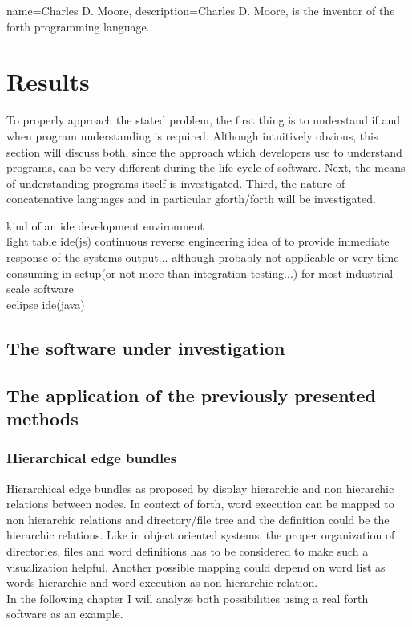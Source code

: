 {
  name={Charles D. Moore},
  description={Charles D. Moore, is the inventor of the forth programming language.}
}

\chapter{Results}
\label{chap:Results}

To properly approach the stated problem, the first thing is to understand if and when program understanding is required. Although intuitively obvious, this section will discuss both, since the approach which developers use to understand programs, can be very different during the life cycle of software. Next, the means of understanding programs itself is investigated. Third, the nature of concatenative languages and in particular gforth/forth will be investigated.



kind of an \sout{ide} development environment\\
light table ide(js) continuous reverse engineering idea of \cite{Muller:2000:RER:336512.336526} to provide immediate response of the systems output... although probably not applicable or very time consuming in setup(or not more than integration testing...) for most industrial scale software\\
eclipse ide(java)

\section{The software under investigation}



\section{The application of the previously presented methods}

\subsection*{Hierarchical edge bundles}
Hierarchical edge bundles as proposed by \cite{Holten:2006:HEB:1187627.1187772} display hierarchic and non hierarchic relations between nodes. In context of forth, word execution can be mapped to non hierarchic relations and directory/file tree and the definition could be the hierarchic relations. Like in object oriented systems, the proper organization of directories, files and word definitions has to be considered to make such a visualization helpful.
Another possible mapping could depend on word list as words hierarchic and word execution as non hierarchic relation.
\\
In the following chapter I will analyze both possibilities using a real forth software as an example.

